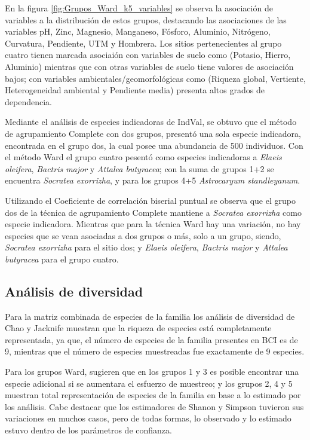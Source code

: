 \documentclass[11pt,]{article}
\begin{document}
En la figura \ref{fig:Grupos_Ward_k5_variables} se observa la asociación
de variables a la distribución de estos grupos, destacando las
asociaciones de las variables pH, Zinc, Magnesio, Manganeso, Fósforo,
Aluminio, Nitrógeno, Curvatura, Pendiente, UTM y Hombrera. Los sitios
pertenecientes al grupo cuatro tienen marcada asociaión con variables de
suelo como (Potasio, Hierro, Aluminio) mientras que con otras variables
de suelo tiene valores de asociación bajos; con variables
ambientales/geomorfológicas como (Riqueza global, Vertiente,
Heterogeneidad ambiental y Pendiente media) presenta altos grados de
dependencia.

Mediante el análisis de especies indicadoras de IndVal, se obtuvo que el
método de agrupamiento Complete con dos grupos, presentó una sola
especie indicadora, encontrada en el grupo dos, la cual posee una
abundancia de 500 individuos. Con el método Ward el grupo cuatro pesentó
como especies indicadoras a \emph{Elaeis oleifera}, \emph{Bactris major}
y \emph{Attalea butyracea}; con la suma de grupos 1+2 se encuentra
\emph{Socratea exorrizha}, y para los grupos 4+5 \emph{Astrocaryum
standleyanum}.

Utilizando el Coeficiente de correlación biserial puntual se observa que
el grupo dos de la técnica de agrupamiento Complete mantiene a
\emph{Socratea exorrizha} como especie indicadora. Mientras que para la
técnica Ward hay una variación, no hay especies que se vean asociadas a
dos grupos o más, solo a un grupo, siendo, \emph{Socratea exorrizha}
para el sitio dos; y \emph{Elaeis oleifera}, \emph{Bactris major} y
\emph{Attalea butyracea} para el grupo cuatro.

\subsection{Análisis de diversidad}\label{anuxe1lisis-de-diversidad}

Para la matriz combinada de especies de la familia los análisis de
diversidad de Chao y Jacknife muestran que la riqueza de especies está
completamente representada, ya que, el número de especies de la familia
presentes en BCI es de 9, mientras que el número de especies muestreadas
fue exactamente de 9 especies.

Para los grupos Ward, sugieren que en los grupos 1 y 3 es posible
encontrar una especie adicional si se aumentara el esfuerzo de muestreo;
y los grupos 2, 4 y 5 muestran total representación de especies de la
familia en base a lo estimado por los análisis. Cabe destacar que los
estimadores de Shanon y Simpson tuvieron sus variaciones en muchos
casos, pero de todas formas, lo observado y lo estimado estuvo dentro de
los parámetros de confianza.
\end{document}
